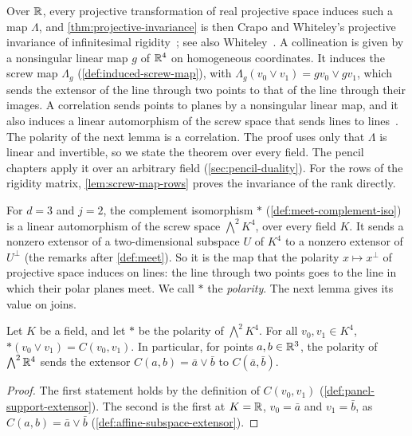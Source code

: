 Over ${\mathbb{R}}$, every projective transformation of real projective space
induces such a map $\Lambda$, and \cref{thm:projective-invariance} is
then Crapo and Whiteley's projective invariance of infinitesimal
rigidity~\cite[\S3.6]{crapoWhiteley1982}; see also
Whiteley~\cite[Theorem~6]{whiteley1999}. A collineation is given by a
nonsingular linear map $g$ of ${\mathbb{R}}^4$ on homogeneous coordinates. It
induces the screw map $\Lambda_g$ (\cref{def:induced-screw-map}), with
$\Lambda_g(v_0 \vee v_1) = g v_0 \vee g v_1$, which sends the extensor of
the line through two points to that of the line through their images. A
correlation sends points to planes by a nonsingular linear map, and it
also induces a linear automorphism of the screw space that sends lines
to lines~\cite[\S3.6]{crapoWhiteley1982}. The polarity of the next
lemma is a correlation. The proof uses only that $\Lambda$ is linear
and invertible, so we state the theorem over every field. The pencil
chapters apply it over an arbitrary field (\cref{sec:pencil-duality}).
For the rows of the rigidity matrix, \cref{lem:screw-map-rows} proves
the invariance of the rank directly.

For $d = 3$ and $j = 2$, the complement isomorphism $*$
(\cref{def:meet-complement-iso}) is a linear automorphism of the screw
space $\bigwedge^2 K^4$, over every field $K$. It sends a nonzero
extensor of a two-dimensional subspace $U$ of $K^4$ to a nonzero
extensor of $U^\perp$ (the remarks after \cref{def:meet}). So it is the
map that the polarity $x \mapsto x^\perp$ of projective space induces on
lines: the line through two points goes to the line in which their
polar planes meet. We call $*$ the \emph{polarity}. The next lemma
gives its value on joins.

\begin{lemma}
  \label{lem:polarity-join}
  \leanok
  Let $K$ be a field, and let $*$ be the polarity of $\bigwedge^2 K^4$.
  For all $v_0, v_1 \in K^4$, $*(v_0 \vee v_1) = C(v_0, v_1)$. In
  particular, for points $a, b \in {\mathbb{R}}^3$, the polarity of
  $\bigwedge^2 {\mathbb{R}}^4$ sends the extensor $C(a, b) = \bar a \vee \bar b$ to
  $C(\bar a, \bar b)$.
\end{lemma}
\begin{proof}
  \leanok
  The first statement holds by the definition of $C(v_0, v_1)$
  (\cref{def:panel-support-extensor}). The second is the first at
  $K = {\mathbb{R}}$, $v_0 = \bar a$ and $v_1 = \bar b$, as
  $C(a, b) = \bar a \vee \bar b$ (\cref{def:affine-subspace-extensor}).
\end{proof}

